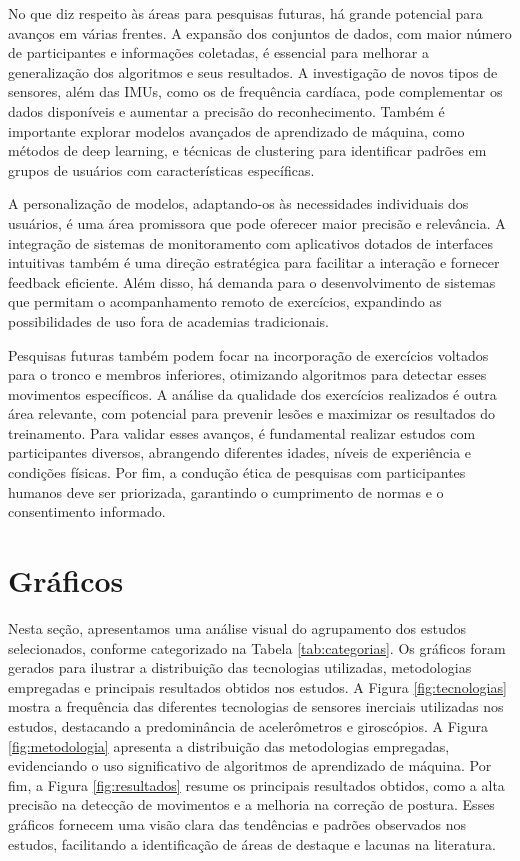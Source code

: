 \documentclass[conference]{IEEEtran}
\begin{document}
No que diz respeito às áreas para pesquisas futuras, há grande potencial para avanços em várias frentes. A expansão dos conjuntos de dados, com maior número de participantes e informações coletadas, é essencial para melhorar a generalização dos algoritmos e seus resultados. A investigação de novos tipos de sensores, além das IMUs, como os de frequência cardíaca, pode complementar os dados disponíveis e aumentar a precisão do reconhecimento. Também é importante explorar modelos avançados de aprendizado de máquina, como métodos de deep learning, e técnicas de clustering para identificar padrões em grupos de usuários com características específicas.

A personalização de modelos, adaptando-os às necessidades individuais dos usuários, é uma área promissora que pode oferecer maior precisão e relevância. A integração de sistemas de monitoramento com aplicativos dotados de interfaces intuitivas também é uma direção estratégica para facilitar a interação e fornecer feedback eficiente. Além disso, há demanda para o desenvolvimento de sistemas que permitam o acompanhamento remoto de exercícios, expandindo as possibilidades de uso fora de academias tradicionais.

Pesquisas futuras também podem focar na incorporação de exercícios voltados para o tronco e membros inferiores, otimizando algoritmos para detectar esses movimentos específicos. A análise da qualidade dos exercícios realizados é outra área relevante, com potencial para prevenir lesões e maximizar os resultados do treinamento. Para validar esses avanços, é fundamental realizar estudos com participantes diversos, abrangendo diferentes idades, níveis de experiência e condições físicas. Por fim, a condução ética de pesquisas com participantes humanos deve ser priorizada, garantindo o cumprimento de normas e o consentimento informado.

\section{Gráficos}
\label{sec:grafics}

Nesta seção, apresentamos uma análise visual do agrupamento dos estudos selecionados, conforme categorizado na Tabela \ref{tab:categorias}. Os gráficos foram gerados para ilustrar a distribuição das tecnologias utilizadas, metodologias empregadas e principais resultados obtidos nos estudos. A Figura \ref{fig:tecnologias} mostra a frequência das diferentes tecnologias de sensores inerciais utilizadas nos estudos, destacando a predominância de acelerômetros e giroscópios. A Figura \ref{fig:metodologia} apresenta a distribuição das metodologias empregadas, evidenciando o uso significativo de algoritmos de aprendizado de máquina. Por fim, a Figura \ref{fig:resultados} resume os principais resultados obtidos, como a alta precisão na detecção de movimentos e a melhoria na correção de postura. Esses gráficos fornecem uma visão clara das tendências e padrões observados nos estudos, facilitando a identificação de áreas de destaque e lacunas na literatura.
\end{document}
